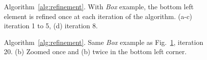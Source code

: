 \documentclass[10pt]{article}
\begin{document}
\begin{figure}[htb]
{  \label{f:box5}
 }
 \caption{Algorithm~\ref{alg:refinement}. With \textit{Box} example, the bottom left element is refined once at each iteration of the algorithm. (a-c) iteration 1 to 5, (d) iteration 8.}
\label{fig:refiningbox}
\end{figure}

\begin{figure}[htb]
\centering
 \caption{Algorithm~\ref{alg:refinement}.  Same \textit{Box} example as Fig.~\ref{fig:refiningbox}, iteration 20. (b) Zoomed once and (b) twice in the bottom left corner.}
\label{fig:refiningbox20}
\end{figure}
\end{document}
